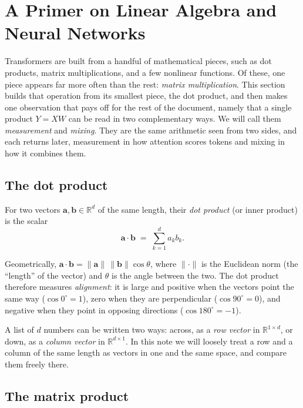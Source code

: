 \documentclass[11pt]{article}
\begin{document}
\section{A Primer on Linear Algebra and Neural Networks}

Transformers are built from a handful of mathematical pieces, such as dot products, matrix multiplications, and a few nonlinear functions. Of these, one piece appears far more often than the rest: \textit{matrix multiplication}. This section builds that operation from its smallest piece, the dot product, and then makes one observation that pays off for the rest of the document, namely that a single product $Y = XW$ can be read in two complementary ways. We will call them \emph{measurement} and \emph{mixing}. They are the same arithmetic seen from two sides, and each returns later, measurement in how attention scores tokens and mixing in how it combines them. 

\subsection*{The dot product}

For two vectors $\mathbf{a},\mathbf{b}\in\mathbb{R}^{d}$ of the same length, their \emph{dot product} (or inner product) is the scalar
\[
\mathbf{a}\cdot\mathbf{b} \;=\; \sum_{k=1}^{d} a_k b_k .
\]

Geometrically, $\mathbf{a}\cdot\mathbf{b}=\lVert\mathbf{a}\rVert\,\lVert\mathbf{b}\rVert\cos\theta$, where $\lVert\cdot\rVert$ is the Euclidean norm (the ``length'' of the vector) and $\theta$ is the angle between the two. The dot product therefore measures \emph{alignment}: it is large and positive when the vectors point the same way ($\cos 0^\circ = 1$), zero when they are perpendicular ($\cos 90^\circ = 0$), and negative when they point in opposing directions ($\cos 180^\circ = -1$).

A list of $d$ numbers can be written two ways: across, as a \emph{row vector} in $\mathbb{R}^{1\times d}$, or down, as a \emph{column vector} in $\mathbb{R}^{d\times 1}$. In this note we will loosely treat a row and a column of the same length as vectors in one and the same space, and compare them freely there.

\subsection*{The matrix product}
\end{document}
